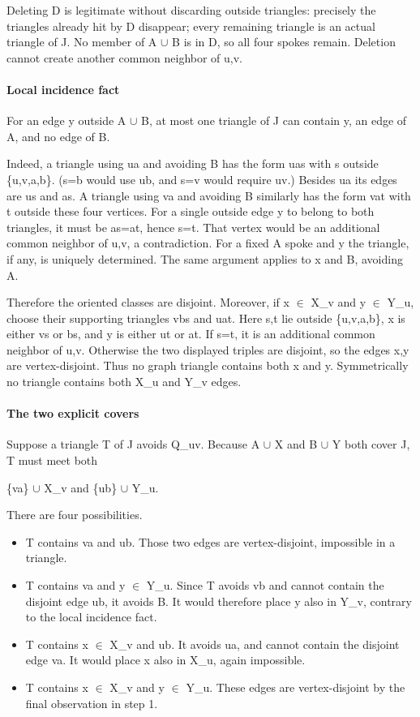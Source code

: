 \documentclass[11pt]{article}
\providecommand{\tightlist}{\setlength{\itemsep}{0pt}\setlength{\parskip}{0pt}}
\begin{document}
Deleting D is legitimate without discarding outside triangles: precisely the triangles already hit by D disappear; every remaining triangle is an actual triangle of J. No member of A \(\cup\) B is in D, so all four spokes remain. Deletion cannot create another common neighbor of u,v.

\paragraph{Local incidence fact}\label{local-incidence-fact}

For an edge y outside A \(\cup\) B, at most one triangle of J can contain y, an edge of A, and no edge of B.

Indeed, a triangle using ua and avoiding B has the form uas with s outside \{u,v,a,b\}. (s=b would use ub, and s=v would require uv.) Besides ua its edges are us and as. A triangle using va and avoiding B similarly has the form vat with t outside these four vertices. For a single outside edge y to belong to both triangles, it must be as=at, hence s=t. That vertex would be an additional common neighbor of u,v, a contradiction. For a fixed A spoke and y the triangle, if any, is uniquely determined. The same argument applies to x and B, avoiding A.

Therefore the oriented classes are disjoint. Moreover, if x \(\in\) X\_v and y \(\in\) Y\_u, choose their supporting triangles vbs and uat. Here s,t lie outside \{u,v,a,b\}, x is either vs or bs, and y is either ut or at. If s=t, it is an additional common neighbor of u,v. Otherwise the two displayed triples are disjoint, so the edges x,y are vertex-disjoint. Thus no graph triangle contains both x and y. Symmetrically no triangle contains both X\_u and Y\_v edges.

\paragraph{The two explicit covers}\label{the-two-explicit-covers}

Suppose a triangle T of J avoids Q\_uv. Because A \(\cup\) X and B \(\cup\) Y both cover J, T must meet both

\{va\} \(\cup\) X\_v and \{ub\} \(\cup\) Y\_u.

There are four possibilities.

\begin{itemize}
\tightlist
\item
  T contains va and ub. Those two edges are vertex-disjoint, impossible in a triangle.
\item
  T contains va and y \(\in\) Y\_u. Since T avoids vb and cannot contain the disjoint edge ub, it avoids B. It would therefore place y also in Y\_v, contrary to the local incidence fact.
\item
  T contains x \(\in\) X\_v and ub. It avoids ua, and cannot contain the disjoint edge va. It would place x also in X\_u, again impossible.
\item
  T contains x \(\in\) X\_v and y \(\in\) Y\_u. These edges are vertex-disjoint by the final observation in step 1.
\end{itemize}
\end{document}
